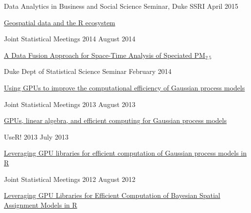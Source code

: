 \documentclass[margin,line]{res}
\begin{document}
\begin{resume}
Data Analytics in Business and Social Science Seminar, Duke SSRI \hfill April 2015
\begin{list1}
\item[] \href{https://github.com/rundel/Presentations/tree/master/Duke%202015%20-%20DABSS}{Geospatial data and the R ecosystem}
\end{list1}
\vspace{-3mm}

Joint Statistical Meetings 2014 \hfill August 2014
\begin{list1}
\item[] \href{https://github.com/rundel/Presentations/tree/master/JSM%202014}{A Data Fusion Approach for Space-Time Analysis of Speciated PM$_{2.5}$}
\end{list1}
\vspace{-3mm}

Duke Dept of Statistical Science Seminar \hfill February 2014
\begin{list1}
\item[] \href{https://github.com/rundel/Presentations/tree/master/Duke%202014}{Using GPUs to improve the computational efficiency of Gaussian process models}
\end{list1}
\vspace{-3mm}


Joint Statistical Meetings 2013 \hfill August 2013
\begin{list1}
\item[] \href{https://github.com/rundel/Presentations/tree/master/JSM%202013}{GPUs, linear algebra, and efficient computing for Gaussian process models}
\end{list1}
\vspace{-3mm}

UseR! 2013 \hfill July 2013
\begin{list1}
\item[] \href{https://github.com/rundel/Presentations/tree/master/UseR2013}{Leveraging GPU libraries for efficient computation of Gaussian process models in R}
\end{list1}
\vspace{-3mm}

Joint Statistical Meetings 2012 \hfill August 2012
\begin{list1}
\item[] \href{https://github.com/rundel/Presentations/tree/master/JSM%202012}{Leveraging GPU Libraries for Efficient Computation of Bayesian Spatial Assignment Models in R}
\end{list1}
\vspace{-3mm}


\end{resume}
\end{document}
